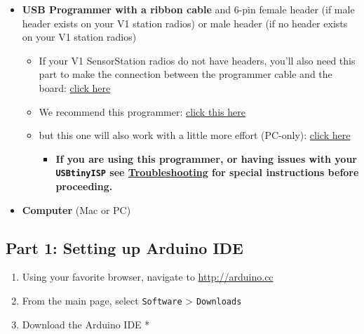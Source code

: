 \documentclass[
]{article}
\providecommand{\tightlist}{%
  \setlength{\itemsep}{0pt}\setlength{\parskip}{0pt}}
\begin{document}
\begin{itemize}
\tightlist
\item
  \textbf{USB Programmer with a ribbon cable} and 6-pin female header
  (if male header exists on your V1 station radios) or male header (if
  no header exists on your V1 station radios)

  \begin{itemize}
  \tightlist
  \item
    If your V1 SensorStation radios do not have headers, you'll also
    need this part to make the connection between the programmer cable
    and the board: \href{https://www.sparkfun.com/products/12807}{click
    here}
  \item
    We recommend this programmer:
    \href{https://www.amazon.com/USBtinyISP-Programmer-Bootloader-Download-Interface/dp/B01FDD4EP0/ref=sr_1_1?crid=3AEXHPTVD9KER\&dchild=1\&keywords=usbtinyisp\&qid=1593638163\&sprefix=usbtiny\%2Caps\%2C149\&sr=8-1}{click
    this here}
  \item
    but this one will also work with a little more effort (PC-only):
    \href{https://www.amazon.com/ARCELI-USBASP-USBasp_H6-Programmer-Support/dp/B0785RQ766/ref=sr_1_12?dchild=1\&keywords=bootloader\&qid=1593638232\&s=electronics\&sr=1-12}{click
    here}

    \begin{itemize}
    \tightlist
    \item
      \textbf{If you are using this programmer, or having issues with
      your \texttt{USBtinyISP} see
      \protect\hyperlink{troubleshooting}{Troubleshooting} for special
      instructions before proceeding.}
    \end{itemize}
  \end{itemize}
\item
  \textbf{Computer} (Mac or PC)
\end{itemize}

\hypertarget{part-1-setting-up-arduino-ide}{%
\subsection{Part 1: Setting up Arduino
IDE}\label{part-1-setting-up-arduino-ide}}

\begin{enumerate}
\def\labelenumi{\arabic{enumi}.}
\tightlist
\item
  Using your favorite browser, navigate to \url{http://arduino.cc}
\item
  From the main page, select \texttt{Software} \textgreater{}
  \texttt{Downloads}
\item
  Download the Arduino IDE *
\end{enumerate}
\end{document}
